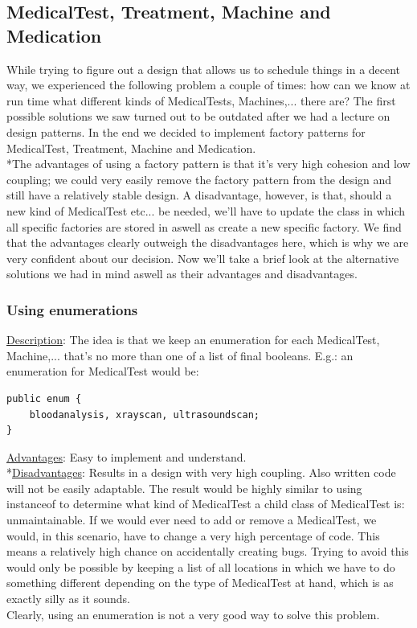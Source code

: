 \documentclass[11pt]{article}
\begin{document}
\subsection{MedicalTest, Treatment, Machine and Medication}
While trying to figure out a design that allows us to schedule things in a decent way, we experienced the following problem a couple of times: how can we know at run time what different kinds of MedicalTests, Machines,... there are? The first possible solutions we saw turned out to be outdated after we had a lecture on design patterns. In the end we decided to implement factory patterns for MedicalTest, Treatment, Machine and Medication. 
\\*The advantages of using a factory pattern is that it's very high cohesion and low coupling; we could very easily remove the factory pattern from the design and still have a relatively stable design. A disadvantage, however, is that, should a new kind of MedicalTest etc... be needed, we'll have to update the class in which all specific factories are stored in aswell as create a new specific factory. We find that the advantages clearly outweigh the disadvantages here, which is why we are very confident about our decision.
\newline Now we'll take a brief look at the alternative solutions we had in mind aswell as their advantages and disadvantages.

\subsubsection{Using enumerations}
\underline{Description}: The idea is that we keep an enumeration for each MedicalTest, Machine,... that's no more than one of a list of final booleans. E.g.: an enumeration for MedicalTest would be:
\begin{lstlisting}
public enum {
	bloodanalysis, xrayscan, ultrasoundscan;
}
\end{lstlisting}
\underline{Advantages}: Easy to implement and understand.
\\*\underline{Disadvantages}: Results in a design with very high coupling. Also written code will not be easily adaptable. The result would be highly similar to using instanceof to determine what kind of MedicalTest a child class of MedicalTest is: unmaintainable. If we would ever need to add or remove a MedicalTest, we would, in this scenario, have to change a very high percentage of code. This means a relatively high chance on accidentally creating bugs. Trying to avoid this would only be possible by keeping a list of all locations in which we have to do something different depending on the type of MedicalTest at hand, which is as exactly silly as it sounds.
\\Clearly, using an enumeration is not a very good way to solve this problem.
\end{document}
